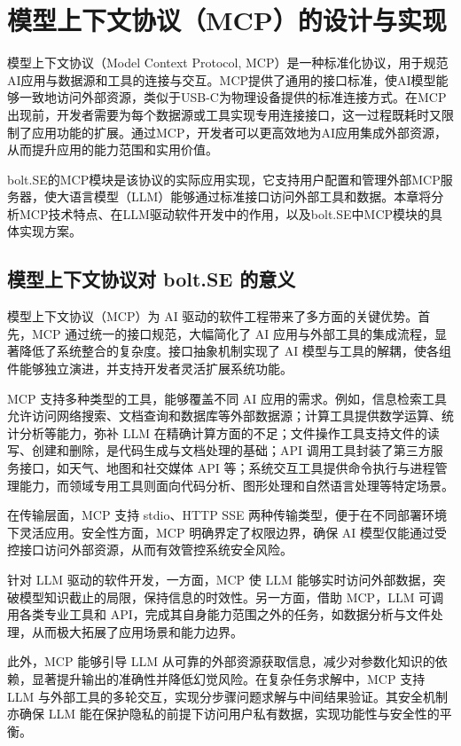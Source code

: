 
\chapter{模型上下文协议（MCP）的设计与实现}
\label{chap:mcp}

模型上下文协议（Model Context Protocol, MCP）是一种标准化协议，用于规范AI应用与数据源和工具的连接与交互。MCP提供了通用的接口标准，使AI模型能够一致地访问外部资源，类似于USB-C为物理设备提供的标准连接方式。在MCP出现前，开发者需要为每个数据源或工具实现专用连接接口，这一过程既耗时又限制了应用功能的扩展。通过MCP，开发者可以更高效地为AI应用集成外部资源，从而提升应用的能力范围和实用价值\cite{mcpspec2023}。

bolt.SE的MCP模块是该协议的实际应用实现，它支持用户配置和管理外部MCP服务器，使大语言模型（LLM）能够通过标准接口访问外部工具和数据。本章将分析MCP技术特点、在LLM驱动软件开发中的作用，以及bolt.SE中MCP模块的具体实现方案。

\section{模型上下文协议对 bolt.SE 的意义}

模型上下文协议（MCP）为 AI 驱动的软件工程带来了多方面的关键优势。首先，MCP 通过统一的接口规范，大幅简化了 AI 应用与外部工具的集成流程，显著降低了系统整合的复杂度。接口抽象机制实现了 AI 模型与工具的解耦，使各组件能够独立演进，并支持开发者灵活扩展系统功能。

MCP 支持多种类型的工具，能够覆盖不同 AI 应用的需求。例如，信息检索工具允许访问网络搜索、文档查询和数据库等外部数据源；计算工具提供数学运算、统计分析等能力，弥补 LLM 在精确计算方面的不足；文件操作工具支持文件的读写、创建和删除，是代码生成与文档处理的基础；API 调用工具封装了第三方服务接口，如天气、地图和社交媒体 API 等；系统交互工具提供命令执行与进程管理能力，而领域专用工具则面向代码分析、图形处理和自然语言处理等特定场景。

在传输层面，MCP 支持 stdio、HTTP SSE 两种传输类型，便于在不同部署环境下灵活应用。安全性方面，MCP 明确界定了权限边界，确保 AI 模型仅能通过受控接口访问外部资源，从而有效管控系统安全风险。

针对 LLM 驱动的软件开发，一方面，MCP 使 LLM 能够实时访问外部数据，突破模型知识截止的局限，保持信息的时效性。另一方面，借助 MCP，LLM 可调用各类专业工具和 API，完成其自身能力范围之外的任务，如数据分析与文件处理，从而极大拓展了应用场景和能力边界。

此外，MCP 能够引导 LLM 从可靠的外部资源获取信息，减少对参数化知识的依赖，显著提升输出的准确性并降低幻觉风险。在复杂任务求解中，MCP 支持 LLM 与外部工具的多轮交互，实现分步骤问题求解与中间结果验证。其安全机制亦确保 LLM 能在保护隐私的前提下访问用户私有数据，实现功能性与安全性的平衡。

